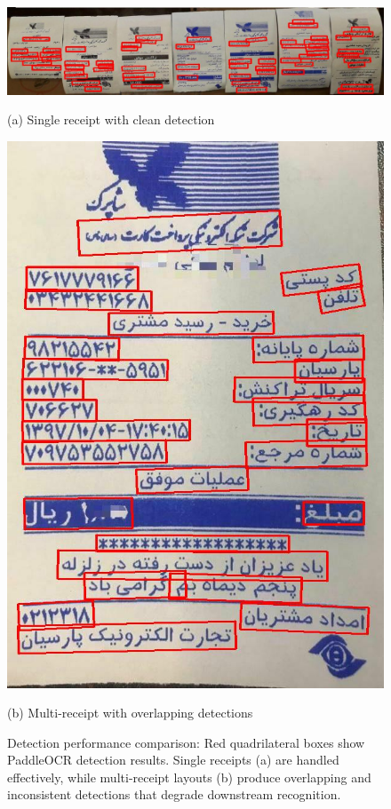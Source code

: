 \documentclass[11pt,a4paper]{article}
\begin{document}
\begin{figure}[h]
  \centering
  \begin{minipage}[b]{0.45\linewidth}
    \centering
    \includegraphics[width=\linewidth]{figures/receipt_single.jpg}
    \caption*{(a) Single receipt with clean detection}
  \end{minipage}\hfill
  \begin{minipage}[b]{0.45\linewidth}
    \centering
    \includegraphics[width=\linewidth]{figures/receipt_multi.jpg}
    \caption*{(b) Multi-receipt with overlapping detections}
  \end{minipage}
  \caption{Detection performance comparison: Red quadrilateral boxes show PaddleOCR detection results. Single receipts (a) are handled effectively, while multi-receipt layouts (b) produce overlapping and inconsistent detections that degrade downstream recognition.}
  \label{fig:receipts}
\end{figure}
\end{document}

